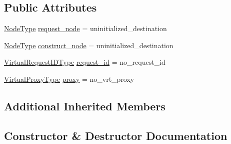 \subsection*{Public Attributes}
\begin{DoxyCompactItemize}
\item 
\hyperlink{namespacevt_a866da9d0efc19c0a1ce79e9e492f47e2}{Node\+Type} \hyperlink{structvt_1_1vrt_1_1_virtual_proxy_request_msg_a17ef52708baa6ba8c47e5a8b7e3a0eb9}{request\+\_\+node} = uninitialized\+\_\+destination
\item 
\hyperlink{namespacevt_a866da9d0efc19c0a1ce79e9e492f47e2}{Node\+Type} \hyperlink{structvt_1_1vrt_1_1_virtual_proxy_request_msg_ae57a7fa0849abff9b9c94206fa458de5}{construct\+\_\+node} = uninitialized\+\_\+destination
\item 
\hyperlink{namespacevt_1_1vrt_ac7ef8820ebfc383fa16f09bf46eaa2b8}{Virtual\+Request\+I\+D\+Type} \hyperlink{structvt_1_1vrt_1_1_virtual_proxy_request_msg_a1cbd1a90c8e622e455d2d9dffd7631cf}{request\+\_\+id} = no\+\_\+request\+\_\+id
\item 
\hyperlink{namespacevt_a1b417dd5d684f045bb58a0ede70045ac}{Virtual\+Proxy\+Type} \hyperlink{structvt_1_1vrt_1_1_virtual_proxy_request_msg_ae7e2b6629045422a7a1fee6dc6b84d1f}{proxy} = no\+\_\+vrt\+\_\+proxy
\end{DoxyCompactItemize}
\subsection*{Additional Inherited Members}


\subsection{Constructor \& Destructor Documentation}
\mbox{\label{structvt_1_1vrt_1_1_virtual_proxy_request_msg_a6110022c17055897cf543078d076fe95}} 
